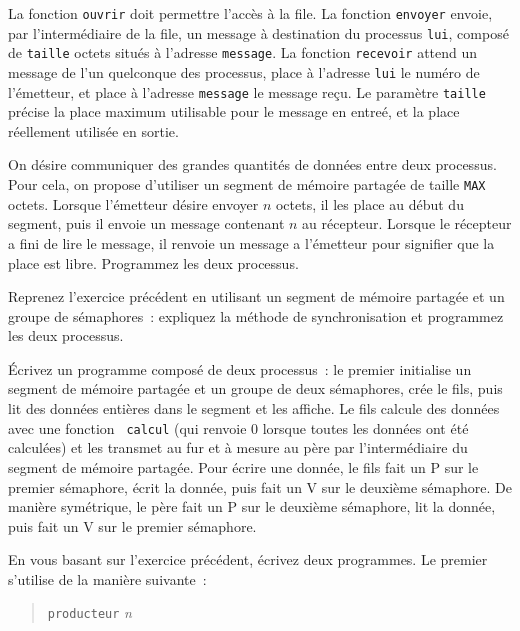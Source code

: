 La fonction {\tt ouvrir} doit permettre l'accès à la file. La fonction
{\tt envoyer} envoie, par l'intermédiaire de la file, un message à
destination du processus {\tt lui}, composé de {\tt taille} octets
situés à l'adresse {\tt message}. La fonction {\tt recevoir} attend un
message de l'un quelconque des processus, place à l'adresse {\tt lui} le
numéro de l'émetteur, et place à l'adresse {\tt message} le message
reçu. Le paramètre {\tt taille} précise la place maximum utilisable pour
le message en entreé, et la place réellement utilisée en sortie.


\question

On désire communiquer des grandes quantités de données entre deux
processus.  Pour cela, on propose d'utiliser un segment de mémoire
partagée de taille {\tt MAX} octets.  Lorsque l'émetteur désire envoyer
$n$ octets, il les place au début du segment, puis il envoie un
message contenant $n$ au récepteur.  Lorsque le récepteur a fini de
lire le message, il renvoie un message a l'émetteur pour signifier que
la place est libre. Programmez les deux processus.


\question

Reprenez l'exercice précédent en utilisant un segment de mémoire
partagée et un groupe de sémaphores~: expliquez la méthode de
synchronisation et programmez les deux processus.


\question

Écrivez un programme composé de deux processus~:  le premier
initialise un segment de mémoire partagée et un groupe de deux
sémaphores, crée le fils, puis lit des données entières dans le segment
et les affiche.  Le fils calcule des données avec une fonction {\tt
calcul} (qui renvoie 0 lorsque toutes les données ont été calculées) et
les transmet au fur et à mesure au père par l'intermédiaire du segment
de mémoire partagée.  Pour écrire une donnée, le fils fait un P sur le
premier sémaphore, écrit la donnée, puis fait un V sur le deuxième
sémaphore.  De manière symétrique, le père fait un P sur le deuxième
sémaphore, lit la donnée, puis fait un V sur le premier sémaphore.


\question

En vous basant sur l'exercice précédent, écrivez deux programmes.
Le premier s'utilise de la manière suivante~:

\begin {quote}
    \small
    \verb|producteur| \textit {n}
\end {quote}

